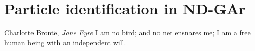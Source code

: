 \chapter{Particle identification in ND-GAr}
\label{chapter:garsoft_pid}

\begin{chapquote}{Charlotte Brontë, \textit{Jane Eyre}}
	I am no bird; and no net ensnares me; I am a free human being with an independent will.
\end{chapquote}

